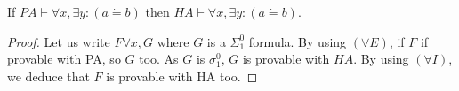 \begin{theoreme}
    If $PA\vdash \forall x,\exists y:(a\dot{=}b)$ then $HA\vdash \forall x, \exists y: (a\dot{=}b)$.
\end{theoreme}
\begin{proof}
    Let us write $F \forall x,G$ where $G$ is a $\Sigma_1^0$ formula. By using $(\forall E)$, if $F$ if provable with PA, so $G$ too. As $G$ is $\sigma_1^0$, $G$ is provable with $HA$. By using $(\forall I)$, we deduce that $F$ is provable with HA too.
\end{proof}


